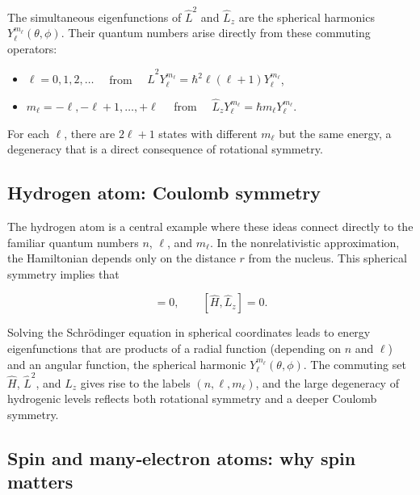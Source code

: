 \documentclass[
  english,
  9pt,
]{extbook}
\providecommand{\tightlist}{%
  \setlength{\itemsep}{0pt}\setlength{\parskip}{0pt}}
\theoremstyle{definition}
\theoremstyle{definition}
\theoremstyle{definition}
\theoremstyle{definition}
\theoremstyle{remark}
\begin{document}
The simultaneous eigenfunctions of \(\hat{L}^2\) and \(\hat{L}_z\) are the spherical harmonics \(Y_\ell^{m_\ell}(\theta,\phi)\). Their quantum numbers arise directly from these commuting operators:

\begin{itemize}
\tightlist
\item
  \(\ell = 0,1,2,\dots\quad\) from \(\quad \hat{L}^2Y_\ell^{m_\ell} = \hbar^2 \ell(\ell+1)Y_\ell^{m_\ell}\),\\
\item
  \(m_\ell = -\ell, -\ell+1, \dots, +\ell\quad\) from \(\quad\hat{L}_zY_\ell^{m_\ell} = \hbar m_\ell Y_\ell^{m_\ell}\).
\end{itemize}

For each \(\ell\), there are \(2\ell+1\) states with different \(m_\ell\) but the same energy, a degeneracy that is a direct consequence of rotational symmetry.

\subsection{Hydrogen atom: Coulomb symmetry}\label{hydrogen-atom-coulomb-symmetry}

The hydrogen atom is a central example where these ideas connect directly to the familiar quantum numbers \(n\), \(\ell\), and \(m_\ell\). In the nonrelativistic approximation, the Hamiltonian depends only on the distance \(r\) from the nucleus. This spherical symmetry implies that

\begin{equation}
[\hat{H}, \hat{L}^2] = 0, \qquad [\hat{H}, \hat{L}_z] = 0.
\label{eq:spop16} 
\end{equation}

Solving the Schrödinger equation in spherical coordinates leads to energy eigenfunctions that are products of a radial function (depending on \(n\) and \(\ell\)) and an angular function, the spherical harmonic \(Y_\ell^{m_\ell}(\theta,\phi)\). The commuting set \(\hat{H}\), \(\hat{L}^2\), and \(\hat{L}_z\) gives rise to the labels \((n, \ell, m_\ell)\), and the large degeneracy of hydrogenic levels reflects both rotational symmetry and a deeper Coulomb symmetry.

\subsection{Spin and many‑electron atoms: why spin matters}\label{spin-and-manyelectron-atoms-why-spin-matters}
\end{document}
